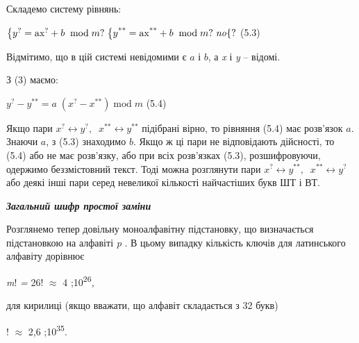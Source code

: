 \documentclass[a4paper]{article}
\newcounter{}
\newcommand\normalsubformula[1]{\text{\mathversion{normal}$#1$}}
\begin{document}
Складемо систему рівнянь:


\bigskip

{\centering
\textsf{ }
${\begin{matrix}\left\{y^{{?}}=\normalsubformula{\text{ax}}^{{?}}+b\;\;\text{mod}\;m?\right.\left\{y^{{\text{**}}}=\normalsubformula{\text{ax}}^{{\text{**}}}+b\;\;\text{mod}\;m?\right.\mathit{no}\hfill\null
\end{matrix}\{?}$\textsf{  }(5.3)
\par}


\bigskip

Відмітимо, що в цій системі невідомими є  ${a}$ і   ${b}$, а 
\textit{x}\textbf{\textit{ }}і\textbf{\textit{ }}\textit{ }\textit{y} – відомі.

З (3)\textbf{ }маємо:

{\centering
\textsf{ }
${y^{{?}}-y^{{\text{**}}}=a\;(x^{{?}}-x^{{\text{**}}})\;\text{mod}\;m}$\textsf{
 }(5.4)
\par}


\bigskip

Якщо пари  ${x^{{?}}\leftrightarrow y^{{?}},\;\;x^{{\text{**}}}\leftrightarrow
y^{{\text{**}}}}$ підібрані  вірно, то рівняння (5.4) має розв’язок  ${a}$.
Знаючи  ${a}$, з (5.3) знаходимо  ${b}$. Якщо ж ці пари не відповідають
дійсності, то (5.4) або не має розв’язку, або при всіх розв’язках (5.3),
розшифровуючи, одержимо беззмістовний текст. Тоді можна розглянути пари 
${x^{{?}}\leftrightarrow y^{{\text{**}}},\;\;x^{{\text{**}}}\leftrightarrow
y^{{?}}}$ або деякі інші пари серед невеликої кількості найчастіших букв ШТ і
ВТ.


\bigskip


\bigskip

{\centering\bfseries\itshape
Загальний шифр простої заміни
\par}


\bigskip


\bigskip

Розглянемо тепер довільну моноалфавітну підстановку, що визначається
підстановкою  на алфавіті  \textit{\textgreek{p}}\textbf{\textit{ }}. В цьому
випадку кількість ключів для латинського алфавіту дорівнює

{\centering
\textit{m}!\textit{ = }26!\textit{ ${\approx}$}\textsf{ }4
\textgreek{;}10\textsuperscript{26}\textit{,}
\par}

для кирилиці (якщо вважати, що алфавіт складається з 32 букв)

{! ${\approx}$ 2,6 \textgreek{;}10\textsuperscript{35}.
\par}
\end{document}
